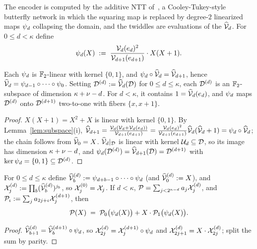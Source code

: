 The encoder is computed by the additive NTT of~\cite{LCH14}, a Cooley-Tukey-style butterfly network in which the squaring map is replaced by degree-$2$ linearized maps $\psi_d$ collapsing the domain, and the twiddles are evaluations of the $\widehat{\mathcal{V}}_{d}$. For $0 \le d < \kappa$ define
\[
\psi_d(X) \;:=\; \frac{\mathcal{V}_d(e_d)^2}{\mathcal{V}_{d+1}(e_{d+1})} \cdot X(X+1).
\]

\begin{lemma}\label{lem:chain}
Each $\psi_d$ is $\mathbb{F}_2$-linear with kernel $\{0,1\}$, and $\psi_d \circ \widehat{\mathcal{V}}_{d} = \widehat{\mathcal{V}}_{d+1}$, hence $\widehat{\mathcal{V}}_{d} = \psi_{d-1} \circ \dots \circ \psi_0$. Setting $\mathcal{D}^{(d)} := \widehat{\mathcal{V}}_{d}(\mathcal{D})$ for $0 \le d \le \kappa$, each $\mathcal{D}^{(d)}$ is an $\mathbb{F}_2$-subspace of dimension $\kappa + \nu - d$. For $d<\kappa$, it contains $1 = \widehat{\mathcal{V}}_{d}(e_d)$, and $\psi_d$ maps $\mathcal{D}^{(d)}$ onto $\mathcal{D}^{(d+1)}$ two-to-one with fibers $\{x, x+1\}$.
\end{lemma}

\begin{proof}
$X(X+1) = X^2 + X$ is linear with kernel $\{0,1\}$. By Lemma~\ref{lem:subspace}(i), $\widehat{\mathcal{V}}_{d+1} = \tfrac{\mathcal{V}_d (\mathcal{V}_d + \mathcal{V}_d(e_d))}{\mathcal{V}_{d+1}(e_{d+1})} = \tfrac{\mathcal{V}_d(e_d)^2}{\mathcal{V}_{d+1}(e_{d+1})} \widehat{\mathcal{V}}_{d}(\widehat{\mathcal{V}}_{d} + 1) = \psi_d \circ \widehat{\mathcal{V}}_{d}$; the chain follows from $\widehat{\mathcal{V}}_{0} = X$. $\widehat{\mathcal{V}}_{d}|_{\mathcal{D}}$ is linear with kernel $\mathcal{U}_d \subseteq \mathcal{D}$, so its image has dimension $\kappa + \nu - d$, and $\psi_d(\mathcal{D}^{(d)}) = \widehat{\mathcal{V}}_{d+1}(\mathcal{D}) = \mathcal{D}^{(d+1)}$ with $\ker \psi_d = \{0,1\} \subseteq \mathcal{D}^{(d)}$.
\end{proof}

\begin{lemma}\label{lem:evenodd}
For $0 \le d \le \kappa$ define $\widehat{\mathcal{V}}_{b}^{(d)} := \psi_{d+b-1} \circ \dots \circ \psi_d$ (and $\widehat{\mathcal{V}}_{0}^{(d)} := X$), and $\mathcal{X}^{(d)}_j := \prod_b (\widehat{\mathcal{V}}_{b}^{(d)})^{j_b}$, so $\mathcal{X}^{(0)}_j = \mathcal{X}_j$. If $d < \kappa$, $\mathcal{P} = \sum_{j < 2^{\kappa-d}} a_j \mathcal{X}^{(d)}_j$, and $\mathcal{P}_\iota := \sum_j a_{2j+\iota} \mathcal{X}^{(d+1)}_j$, then
\[
\mathcal{P}(X) \;=\; \mathcal{P}_0\bigl(\psi_d(X)\bigr) + X \cdot \mathcal{P}_1\bigl(\psi_d(X)\bigr).
\]
\end{lemma}

\begin{proof}
$\widehat{\mathcal{V}}_{b+1}^{(d)} = \widehat{\mathcal{V}}_{b}^{(d+1)} \circ \psi_d$, so $\mathcal{X}^{(d)}_{2j} = \mathcal{X}^{(d+1)}_j \circ \psi_d$ and $\mathcal{X}^{(d)}_{2j+1} = X \cdot \mathcal{X}^{(d)}_{2j}$; split the sum by parity.
\end{proof}

